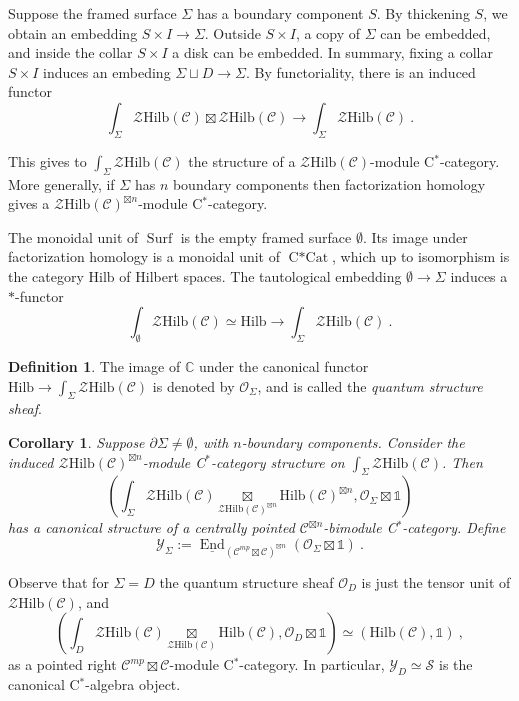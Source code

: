 \documentclass[a4paper,11pt,reqno]{amsart}
\numberwithin{equation}{section}
\newtheorem{corollary}[theorem]{Corollary}
\theoremstyle{remark}
\theoremstyle{definition}
\newtheorem{definition}[theorem]{Definition}
\newcommand{\C}{\mathbb C}
\newcommand{\cC}{\mathcal C}
\newcommand{\cO}{\mathcal O}
\newcommand{\cS}{\mathcal S}
\newcommand{\cY}{\mathcal Y}
\newcommand{\cZ}{\mathcal Z}
\DeclareMathOperator{\End}{End}
\DeclareMathOperator{\Surf}{Surf}
\DeclareMathOperator{\CCat}{C*Cat}
\newcommand\un{{\mathds 1}}
\newcommand{\Hilb}{\mathrm{Hilb}}
\begin{document}
 



Suppose the framed surface $\Sigma$ has a boundary component $S$. By thickening $S$, we obtain an embedding $S\times I \to \Sigma$. Outside $S \times I$, a copy of $\Sigma$ can be embedded, and inside the collar $S \times I$ a disk can be embedded. In summary, fixing a collar $S \times I$ induces an embeding $\Sigma \sqcup D \to \Sigma$. By functoriality, there is an induced functor
\[
\int_\Sigma \cZ \Hilb(\cC) \boxtimes \cZ \Hilb(\cC) \to \int_\Sigma \cZ \Hilb(\cC) \ .
\]

This gives to $\int_\Sigma \cZ \Hilb(\cC)$ the structure of a $\cZ \Hilb(\cC)$-module C$^*$-category. More generally, if $\Sigma$ has $n$ boundary components then factorization homology gives a $\cZ \Hilb(\cC)^{\boxtimes n}$-module C$^*$-category.
\smallskip 

The monoidal unit of $\Surf$ is the empty framed surface $\emptyset$. Its image under factorization homology is a monoidal unit of $\CCat$, which up to isomorphism is the category $\Hilb$ of Hilbert spaces. The tautological embedding $\emptyset \to \Sigma$ induces a $*$-functor
\[
\int_\emptyset \cZ \Hilb(\cC) \simeq \Hilb \to \int_\Sigma \cZ \Hilb(\cC) \ .
\]

\begin{definition}
	The image of $\C$ under the canonical functor $\Hilb \to \int_\Sigma \cZ \Hilb(\cC)$ is denoted by $\cO_\Sigma$, and is called the {\em quantum structure sheaf}.
\end{definition}

\begin{corollary}
	Suppose $\partial \Sigma \neq \emptyset$, with $n$-boundary components. Consider the induced $\cZ \Hilb(\cC)^{\boxtimes n}$-module C$^*$-category structure on $\int_\Sigma \cZ \Hilb(\cC)$. Then
	\[
	\left(  \int_{\Sigma} \cZ \Hilb(\cC) \underset{\cZ \Hilb(\cC)^{\boxtimes n}}{\boxtimes} \Hilb(\cC)^{\boxtimes n}, \cO_\Sigma \boxtimes \un  \right)
	\]
	has a canonical structure of a centrally pointed $\cC^{\boxtimes n}$-bimodule C$^*$-category. Define
	\[
	\cY_\Sigma := \underline{\End}_{(\cC^{mp} \boxtimes \cC)^{\boxtimes n}}(\cO_\Sigma \boxtimes \un) \ . 
	\]
\end{corollary}

Observe that for $\Sigma = D$ the quantum structure sheaf $\cO_D$ is just the tensor unit of $\cZ \Hilb(\cC)$, and
\[
	\left(  \int_{D} \cZ \Hilb(\cC) \underset{\cZ \Hilb(\cC)}{\boxtimes} \Hilb(\cC), \cO_D \boxtimes \un  \right) \simeq (\Hilb(\cC), \un) \ ,
\]
as a pointed right $\cC^{mp} \boxtimes \cC$-module C$^*$-category. In particular, $\cY_D \simeq \cS$ is the canonical C$^*$-algebra object.
\end{document}
